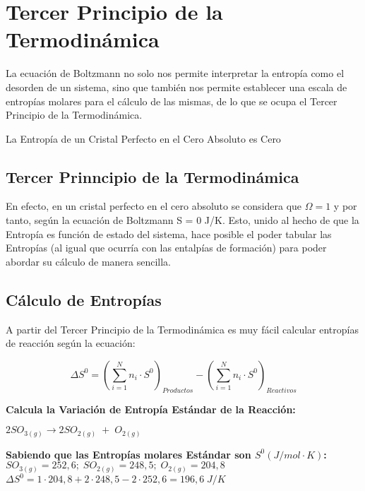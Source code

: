 \section{Tercer Principio de la Termodinámica}

La ecuación de Boltzmann no solo nos permite interpretar la entropía como el desorden de un sistema, sino que también nos permite establecer una escala de entropías molares para el cálculo de las mismas, de lo que se ocupa el Tercer Principio de la Termodinámica.\\

\begin{definition}
	La Entropía de un Cristal Perfecto en el Cero Absoluto es Cero
\end{definition}
\subsection{Tercer Prinncipio de la Termodinámica}

En efecto, en un cristal perfecto en el cero absoluto se considera que $\Omega = 1$ y por tanto, según la ecuación de Boltzmann S = 0 J/K. Esto, unido al hecho de que la Entropía es función de estado del sistema, hace posible el poder tabular las Entropías (al igual que ocurría con las entalpías de formación) para poder abordar su cálculo de manera sencilla.

\subsection{Cálculo de Entropías}

A partir del Tercer Principio de la Termodinámica es muy fácil calcular entropías de reacción según la ecuación:
\\

\begin{center}
	
	$$\Delta S^0 = (\sum_{i=1}^{N} n_i \cdot S^0)_{Productos} - (\sum_{i=1}^{N} n_i \cdot S^0)_{Reactivos}$$
	
\end{center}

\begin{exercise}
	\textbf{Calcula la Variación de Entropía Estándar de la Reacción:}
	\begin{center}
		$2SO_{3(g)} \longrightarrow 2SO_{2(g)} \; + \; O_{2(g)}$
	\end{center}
	
	\textbf{Sabiendo que las Entropías molares Estándar son $S^0 (J/mol\cdot K)$:}$SO_{3(g)} = 252,6;\; SO_{2(g)} = 248,5;\; O_{2(g)} = 204,8$\\
	
	$\Delta S^0 = 1\cdot 204,8 + 2\cdot 248,5 - 2\cdot 252,6 = 196,6\; J/K$
	
\end{exercise}

